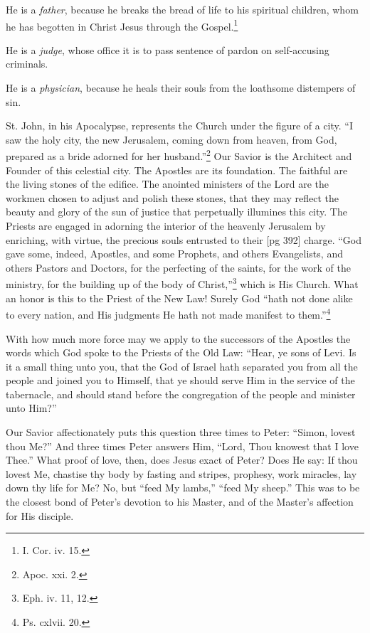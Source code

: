 He is a \emph{father}, because he breaks the bread of
life to his spiritual children, whom he has begotten
in Christ Jesus through the Gospel.\footnote{I. Cor. iv. 15.}

He is a \emph{judge}, whose office it is to pass sentence
of pardon on self-accusing criminals.

He is a \emph{physician}, because he heals their souls
from the loathsome distempers of sin.

St. John, in his Apocalypse, represents the
Church under the figure of a city. “I saw the
holy city, the new Jerusalem, coming down from
heaven, from God, prepared as a bride adorned for
her husband.”\footnote{Apoc. xxi.
2.} Our Savior is the Architect and
Founder of this celestial city. The Apostles are
its foundation. The faithful are the living stones
of the edifice. The anointed ministers of the Lord
are the workmen chosen to adjust and polish these
stones, that they may reflect the beauty and glory
of the sun of justice that perpetually illumines
this city. The Priests are engaged in adorning the
interior of the heavenly Jerusalem by enriching,
with virtue, the precious souls entrusted to their
[pg 392]
charge. “God gave some, indeed, Apostles, and
some Prophets, and others Evangelists, and others
Pastors and Doctors, for the perfecting of the
saints, for the work of the ministry, for the building
up of the body of Christ,”\footnote{Eph.
iv. 11, 12.} which is His
Church. What an honor is this to the Priest of
the New Law! Surely God “hath not done alike
to every nation, and His judgments He hath not
made manifest to them.”\footnote{Ps. cxlvii. 20.}

With how much more force may we apply to the
successors of the Apostles the words which God
spoke to the Priests of the Old Law: “Hear, ye
sons of Levi. Is it a small thing unto you, that
the God of Israel hath separated you from all the
people and joined you to Himself, that ye should
serve Him in the service of the tabernacle, and
should stand before the congregation of the people
and minister unto Him?”

Our Savior affectionately puts this question
three times to Peter: “Simon, lovest thou Me?”
And three times Peter answers Him, “Lord, Thou
knowest that I love Thee.” What proof of love,
then, does Jesus exact of Peter? Does He say: If
thou lovest Me, chastise thy body by fasting and
stripes, prophesy, work miracles, lay down thy
life for Me? No, but “feed My lambs,” “feed
My sheep.” This was to be the closest bond of
Peter's devotion to his Master, and of the Master's
affection for His disciple.

